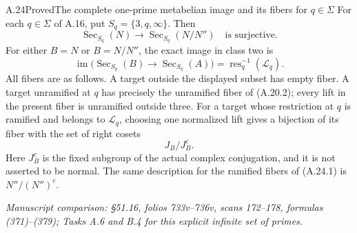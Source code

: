 \begin{statement}{A.24}{Proved}{The complete one-prime metabelian image and its fibers for $q\in\Sigma$}
For each $q\in\Sigma$ of A.16, put $S_q=\{3,q,\infty\}$.
Then
\[
 \operatorname{Sec}_{S_q}(N)\longrightarrow
 \operatorname{Sec}_{S_q}(N/N'')
       \quad\text{is surjective}.
 \tag{A.24.1}
\]
For either $B=N$ or $B=N/N''$, the exact image in class
two is
\[
 \operatorname{im}\bigl(\operatorname{Sec}_{S_q}(B)
                  \to\operatorname{Sec}_{S_q}(A)\bigr)
   =\operatorname{res}_q^{-1}(\mathscr L_q).
 \tag{A.24.2}
\]
All fibers are as follows. A target outside the displayed
subset has empty fiber. A target unramified at $q$ has
precisely the unramified fiber of (A.20.2); every lift in
the present fiber is unramified outside three. For a target
whose restriction at $q$ is ramified and belongs to
$\mathscr L_q$, choosing one normalized lift gives a
bijection of its fiber with the set of right cosets
\[
                         J_B/J_B^c.
 \tag{A.24.3}
\]
Here $J_B^c$ is the fixed subgroup of the actual complex
conjugation, and it is not asserted to be normal.
The same description for the ramified fibers of
(A.24.1) is $N''/(N'')^c$.
\par\smallskip\noindent\emph{Manuscript comparison: \S51.16,
folios 733v--736v, scans 172--178, formulas (371)--(379);
Tasks A.6 and B.4 for this explicit infinite set of primes.}
\end{statement}
